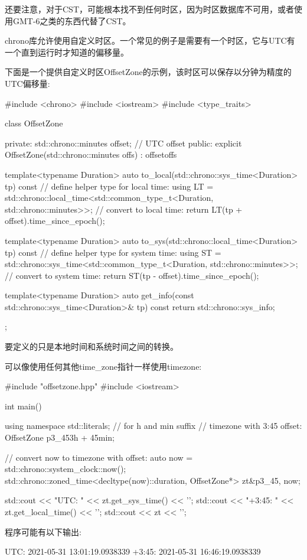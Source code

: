 还要注意，对于CST，可能根本找不到任何时区，因为时区数据库不可用，或者使用GMT-6之类的东西代替了CST。


chrono库允许使用自定义时区。一个常见的例子是需要有一个时区，它与UTC有一个直到运行时才知道的偏移量。

下面是一个提供自定义时区OffsetZone的示例，该时区可以保存以分钟为精度的UTC偏移量:


\begin{cpp}
#include <chrono>
#include <iostream>
#include <type_traits>

class OffsetZone
{
	private:
	std::chrono::minutes offset; // UTC offset
	public:
	explicit OffsetZone(std::chrono::minutes offs)
	: offset{offs} {
	}
	
	template<typename Duration>
	auto to_local(std::chrono::sys_time<Duration> tp) const {
		// define helper type for local time:
		using LT
		= std::chrono::local_time<std::common_type_t<Duration,
													std::chrono::minutes>>;
		// convert to local time:
		return LT{(tp + offset).time_since_epoch()};
	}
	
	template<typename Duration>
	auto to_sys(std::chrono::local_time<Duration> tp) const {
		// define helper type for system time:
		using ST
		= std::chrono::sys_time<std::common_type_t<Duration,
													std::chrono::minutes>>;
		// convert to system time:
		return ST{(tp - offset).time_since_epoch()};
	}
	
	template<typename Duration>
	auto get_info(const std::chrono::sys_time<Duration>& tp) const {
		return std::chrono::sys_info{};
	}
};
\end{cpp}

要定义的只是本地时间和系统时间之间的转换。

可以像使用任何其他time\_zone指针一样使用timezone:


\begin{cpp}
#include "offsetzone.hpp"
#include <iostream>

int main()
{
	using namespace std::literals; // for h and min suffix
	// timezone with 3:45 offset:
	OffsetZone p3_45{3h + 45min};
	
	// convert now to timezone with offset:
	auto now = std::chrono::system_clock::now();
	std::chrono::zoned_time<decltype(now)::duration, OffsetZone*> zt{&p3_45, now};
	
	std::cout << "UTC: " << zt.get_sys_time() << '\n';
	std::cout << "+3:45: " << zt.get_local_time() << '\n';
	std::cout << zt << '\n';
}
\end{cpp}

程序可能有以下输出:

\begin{shell}
UTC:    2021-05-31 13:01:19.0938339
+3:45:  2021-05-31 16:46:19.0938339
\end{shell}










